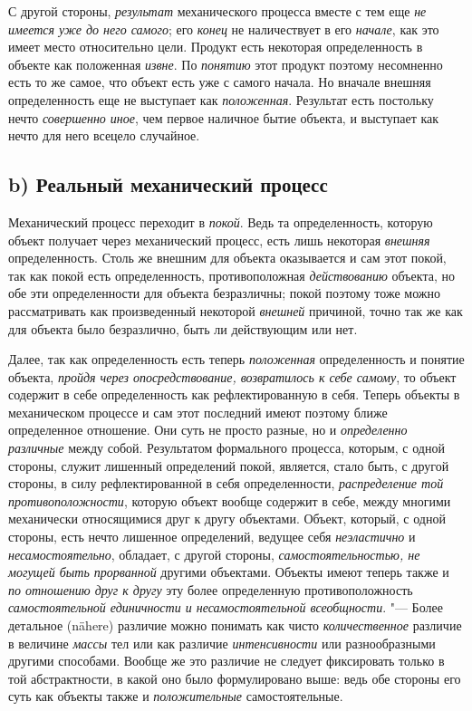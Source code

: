 {{С другой стороны,
{\em результат}
механического процесса вместе с тем еще
{\em не имеется уже до него самого};
его {\em конец}
не наличествует в его
{\em начале}, как это
имеет место относительно цели. Продукт есть некоторая определенность в
объекте как положенная {\em извне}.
По {\em понятию}
этот продукт поэтому несомненно есть то же самое, что объект
есть уже с самого начала. Но вначале внешняя определенность еще не
выступает как {\em положенная}.
Результат есть постольку нечто
{\em совершенно иное},
чем первое наличное бытие объекта, и выступает как нечто для
него всецело случайное.

\subsection[b) Реальный механический процесс]{b) Реальный механический процесс}
Механический процесс переходит в
{\em покой}. Ведь та
определенность, которую объект получает через механический процесс, есть
лишь некоторая {\em внешняя}
определенность. Столь же внешним для объекта оказывается и
сам этот покой, так как покой есть определенность, противоположная
{\em действованию}
объекта, но обе эти определенности для объекта безразличны;
покой поэтому тоже можно рассматривать как произведенный некоторой
{\em внешней} причиной,
точно так же как для объекта было безразлично, быть ли действующим или нет.

Далее, так как определенность есть теперь
{\em положенная}
определенность и понятие объекта,
{\em пройдя через опосредствование,
возвратилось к себе самому}, то объект содержит в себе
определенность как рефлектированную в себя. Теперь объекты в
механическом процессе и сам этот последний имеют поэтому ближе определенное
отношение. Они суть не просто разные, но и
{\em определенно различные}
между собой. Результатом формального процесса, которым, с
одной стороны, служит лишенный определений покой, является, стало быть, с
другой стороны, в силу рефлектированной в себя определенности,
{\em распределение той
противоположности}, которую объект вообще содержит в себе,
между многими механически относящимися друг к другу объектами. Объект,
который, с одной стороны, есть нечто лишенное определений, ведущее себя
{\em неэластично} и
{\em несамостоятельно},
обладает, с другой стороны,
{\em самостоятельностью, не могущей быть
прорванной }другими объектами. Объекты имеют теперь также и
{\em по отношению друг к другу}
эту более определенную противоположность
{\em самостоятельной единичности и
несамостоятельной всеобщности}. "--- Более детальное (nähere)
различие можно понимать как чисто
{\em количественное}
различие в величине
{\em массы} тел или как
различие {\em интенсивности}
или разнообразными другими способами. Вообще же это различие
не следует фиксировать только в той абстрактности, в какой оно было
формулировано выше: ведь обе стороны его суть как объекты также и
{\em положительные}
самостоятельные.

}}

